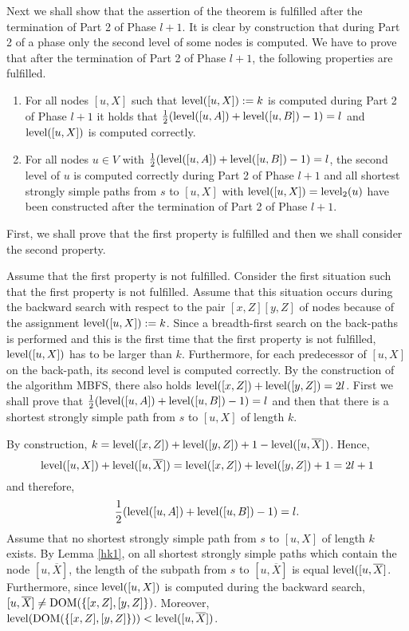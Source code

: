 \documentclass[12pt,twoside,a4paper]{article}
\def\DOM{{\rm DOM}}
\def\lev{{\rm level}}
\begin{document}
\medskip
Next we shall show that the assertion of the theorem is fulfilled after the termination
of Part 2 of Phase $l+1$. It is clear by construction that during Part 2 of a phase only 
the second level of some nodes is computed. We have to prove that after the termination 
of Part 2 of Phase $l+1$, the following properties are fulfilled.
\begin{enumerate}
\item
For all nodes $[u,X]$ such that $\lev([u,X]) := k$ is computed during Part 2 of Phase $l+1$ 
it holds that $\frac{1}{2}(\lev([u,A]) + \lev([u,B]) - 1) = l$ and $\lev([u,X])$ is computed
correctly.
\item
For all nodes $u \in V$ with $\frac{1}{2}(\lev([u,A]) + \lev([u,B]) - 1) = l$, 
the second level of $u$ is computed correctly during Part 2 of Phase $l+1$ and
all shortest strongly simple paths from $s$ to $[u,X]$ with $\lev([u,X]) = \lev_2(u)$ have
been constructed after the termination of Part 2 of Phase $l+1$.
\end{enumerate}
First, we shall prove that the first property is fulfilled and then we shall consider the
second property. 

\medskip
Assume that the first property is not fulfilled. Consider the first situation such that
the first property is not fulfilled. Assume that this situation occurs during the backward 
search with respect to the pair $[x,Z][y,Z]$ of nodes because of the assignment 
$\lev([u,X]) := k$. Since a breadth-first search on the back-paths is performed and this is 
the first time that the first property is not fulfilled, $\lev([u,X])$ has to be larger than 
$k$. Furthermore, for each predecessor of $[u,X]$ on the back-path, its second level is computed
correctly. 
By the construction of the algorithm MBFS, there also holds $\lev([x,Z]) + \lev([y,Z]) = 2l$.
First we shall prove that $\frac{1}{2}(\lev([u,A]) + \lev([u,B]) - 1) = l$ and then that 
there is a shortest strongly simple path from $s$ to $[u,X]$ of length $k$.

By construction, $k = \lev([x,Z]) + \lev([y,Z]) + 1 - \lev([u,\overline{X}])$. 
Hence,
$$\lev([u,X]) + \lev([u,\overline{X}]) = \lev([x,Z] ) + \lev([y,Z]) + 1 = 2l + 1$$
and therefore,
$$\frac{1}{2}(\lev([u,A]) + \lev([u,B]) - 1) = l.$$
Assume that no shortest strongly simple path from $s$ to $[u,X]$ of length $k$ exists. 
By Lemma \ref{hk1}, on all shortest strongly simple paths which contain the node 
$[u,\overline{X}]$, the length of the subpath from $s$ to $[u,\overline{X}]$ is equal
$\lev([u,\overline{X}]$. Furthermore, since $\lev([u,X])$ is computed during the backward 
search, $[u,\overline{X}] \not= \DOM(\{[x,Z],[y,Z]\})$. Moreover, 
$\lev(\DOM(\{[x,Z],[y,Z]\})) < \lev([u,\overline{X}])$.
\end{document}
